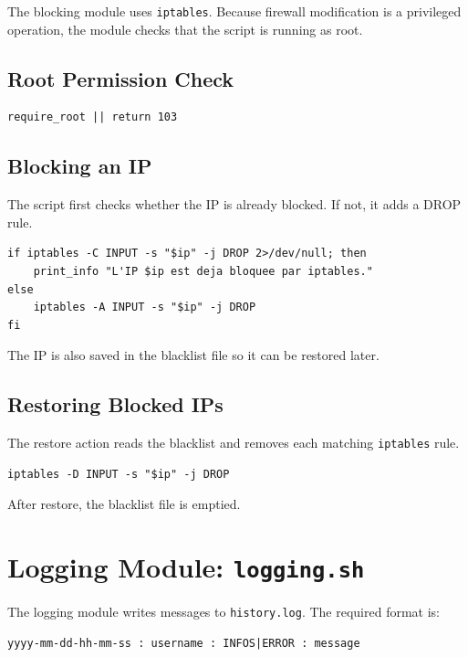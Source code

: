 \documentclass[12pt,a4paper]{article}
\begin{document}
The blocking module uses \texttt{iptables}. Because firewall modification is a privileged
operation, the module checks that the script is running as root.

\subsection{Root Permission Check}

\begin{lstlisting}[style=bashstyle]
require_root || return 103
\end{lstlisting}

\subsection{Blocking an IP}

The script first checks whether the IP is already blocked. If not, it adds a DROP rule.

\begin{lstlisting}[style=bashstyle]
if iptables -C INPUT -s "$ip" -j DROP 2>/dev/null; then
    print_info "L'IP $ip est deja bloquee par iptables."
else
    iptables -A INPUT -s "$ip" -j DROP
fi
\end{lstlisting}

The IP is also saved in the blacklist file so it can be restored later.

\subsection{Restoring Blocked IPs}

The restore action reads the blacklist and removes each matching \texttt{iptables} rule.

\begin{lstlisting}[style=bashstyle]
iptables -D INPUT -s "$ip" -j DROP
\end{lstlisting}

After restore, the blacklist file is emptied.

\section{Logging Module: \texttt{logging.sh}}

The logging module writes messages to \texttt{history.log}. The required format is:

\begin{lstlisting}[style=bashstyle]
yyyy-mm-dd-hh-mm-ss : username : INFOS|ERROR : message
\end{lstlisting}
\end{document}
